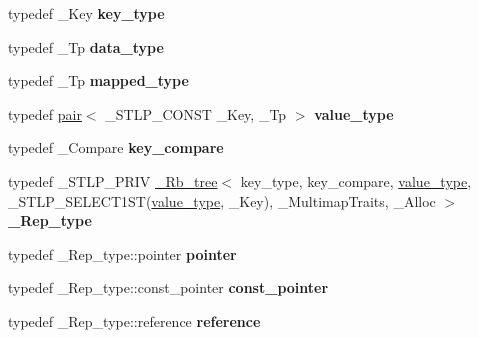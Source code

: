 \begin{DoxyCompactItemize}
\item 
\mbox{\label{classmultimap_a4b4e415c56cdbcf364bbb1cc532fc10e}} 
typedef \+\_\+\+Key {\bfseries key\+\_\+type}
\item 
\mbox{\label{classmultimap_a4f78d61728400644f5f2728dd00c18a4}} 
typedef \+\_\+\+Tp {\bfseries data\+\_\+type}
\item 
\mbox{\label{classmultimap_a5e522d435cef561927b1057f17f6f9c0}} 
typedef \+\_\+\+Tp {\bfseries mapped\+\_\+type}
\item 
\mbox{\label{classmultimap_a3026370fca3078176f2958e382520dc1}} 
typedef \hyperlink{structpair}{pair}$<$ \+\_\+\+S\+T\+L\+P\+\_\+\+C\+O\+N\+ST \+\_\+\+Key, \+\_\+\+Tp $>$ {\bfseries value\+\_\+type}
\item 
\mbox{\label{classmultimap_a9d529ff8ba86f2c446cb2052b18a27bc}} 
typedef \+\_\+\+Compare {\bfseries key\+\_\+compare}
\item 
\mbox{\label{classmultimap_a0ea658cbfe892cdf6456122737f6ff21}} 
typedef \+\_\+\+S\+T\+L\+P\+\_\+\+P\+R\+IV \hyperlink{class___rb__tree}{\+\_\+\+Rb\+\_\+tree}$<$ key\+\_\+type, key\+\_\+compare, \hyperlink{structpair}{value\+\_\+type}, \+\_\+\+S\+T\+L\+P\+\_\+\+S\+E\+L\+E\+C\+T1\+ST(\hyperlink{structpair}{value\+\_\+type}, \+\_\+\+Key), \+\_\+\+Multimap\+Traits, \+\_\+\+Alloc $>$ {\bfseries \+\_\+\+Rep\+\_\+type}
\item 
\mbox{\label{classmultimap_ab8b0981af69ee552da3b33bc40e29a6d}} 
typedef \+\_\+\+Rep\+\_\+type\+::pointer {\bfseries pointer}
\item 
\mbox{\label{classmultimap_ae977887e4a77c7aed2d09a23f975a20f}} 
typedef \+\_\+\+Rep\+\_\+type\+::const\+\_\+pointer {\bfseries const\+\_\+pointer}
\item 
\mbox{\label{classmultimap_ab551cc0483e8c5a67c06a2e80418127a}} 
typedef \+\_\+\+Rep\+\_\+type\+::reference {\bfseries reference}
\item 
\mbox{\label{classmultimap_a013f2483a8f14c1d7ab9c8daeeac65d7}} 

\end{DoxyCompactItemize}
